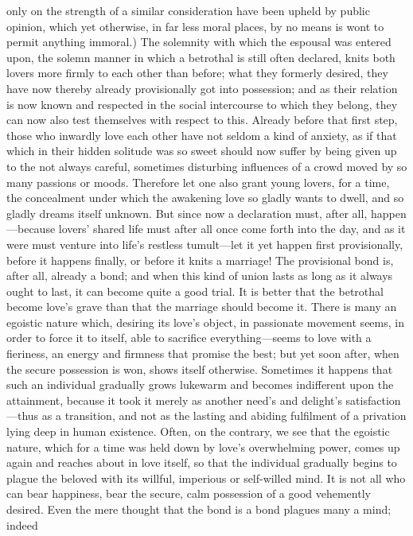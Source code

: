 \documentclass[12pt,a4paper]{book}
\begin{document}
only on the strength of a similar consideration have been upheld by public
opinion, which yet otherwise, in far less moral places, by no means is wont
to permit anything immoral.) The solemnity with which the espousal was
entered upon, the solemn manner in which a betrothal is still often
declared, knits both lovers more firmly to each other than before; what
they formerly desired, they have now thereby already provisionally got into
possession; and as their relation is now known and respected in the social
intercourse to which they belong, they can now also test themselves with
respect to this. Already before that first step, those who inwardly love
each other have not seldom a kind of anxiety, as if that which in their
hidden solitude was so sweet should now suffer by being given up to the not
always careful, sometimes disturbing influences of a crowd moved by so many
passions or moods. Therefore let one also grant young lovers, for a time,
the concealment under which the awakening love so gladly wants to dwell,
and so gladly dreams itself unknown. But since now a declaration must,
after all, happen---because lovers' shared life must after all once come
forth into the day, and as it were must venture into life's restless
tumult---let it yet happen first provisionally, before it happens finally,
or before it knits a marriage! The provisional bond is, after all, already
a bond; and when this kind of union lasts as long as it always ought to
last, it can become quite a good trial. It is better that the betrothal
become love's grave than that the marriage should become it.
There is many an egoistic nature which, desiring its love's object, in
passionate movement seems, in order to force it to itself, able to
sacrifice everything---seems to love with a fieriness, an energy and
firmness that promise the best; but yet soon after, when the secure
possession is won, shows itself otherwise. Sometimes it happens that such
an individual gradually grows lukewarm and becomes indifferent upon the
attainment, because it took it merely as another need's and delight's
satisfaction---thus as a transition, and not as the lasting and abiding
fulfilment of a privation lying deep in human existence. Often, on the
contrary, we see that the egoistic nature, which for a time was held down by
love's overwhelming power, comes up again and reaches about in love itself,
so that the individual gradually begins to plague the beloved with its
willful, imperious or self-willed mind. It is not all who can bear
happiness, bear the secure, calm possession of a good vehemently desired.
Even the mere thought that the bond is a bond plagues many a mind; indeed
\end{document}

